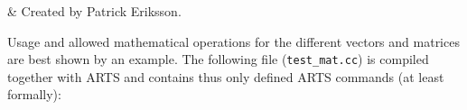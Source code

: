  \label{app:math}


 & Created by Patrick Eriksson. \\
\stophistory

 Usage and allowed mathematical operations for the different vectors
 and matrices are best shown by an example. The following file
 (\verb|test_mat.cc|) is compiled together with ARTS and contains thus
 only defined ARTS commands (at least formally):

{\footnotesize
 }



